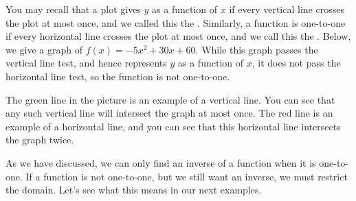 \documentclass{ximera}
\begin{document}
You may recall that a plot gives $y$ as a function of $x$ if every
vertical line crosses the plot at most once, and we called this
the . Similarly, a function is one-to-one
if every horizontal line crosses the plot at most once, and we call this 
 the . Below, we give a graph
of $f(x)=-5x^2+30x+60$. While this graph passes the vertical line test,
and hence represents $y$ as a function of $x$, it does not pass the
horizontal line test, so the function is not one-to-one.
\begin{image}
\end{image}

The green line in the picture is an example of a vertical line.  You
can see that any such vertical line will intersect the graph at most
once.  The red line is an example of a horizontal line, and you can
see that this horizontal line intersects the graph twice.

As we have discussed, we can only find an inverse of a function when
it is one-to-one.  If a function is not one-to-one, but we still want
an inverse, we must restrict the domain. Let's see what this means in
our next examples.
\end{document}
